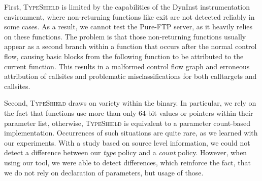 % 
% 

First, \textsc{TypeShield} is limited by the capabilities of the DynInst instrumentation environment, where non-returning functions like exit are 
not detected reliably in some cases. As a result, we cannot test the Pure-FTP server, as it heavily relies on these functions. 
The problem is that those non-returning functions usually appear as a second branch within a function that occurs after the normal 
control flow, causing basic blocks from the following function to be attributed to the current function. This results in a malformed 
control flow graph and erroneous attribution of callsites and problematic misclassifications for both calltargets and callsites.

Second, \textsc{TypeShield} draws on variety within the binary. In particular, we rely on the fact that functions use more than only 
64-bit values or pointers within their parameter list, otherwise, \textsc{TypeShield} is equivalent to a parameter count-based implementation. 
Occurrences of such situations are quite rare, as we learned with our experiments. With a study based on source level information, we could not 
detect a difference between our \textit{type} policy and a \textit{count} policy. However, when using our tool, we were able to detect differences,
which reinforce the fact, that we do not rely on declaration of parameters, but usage of those.

